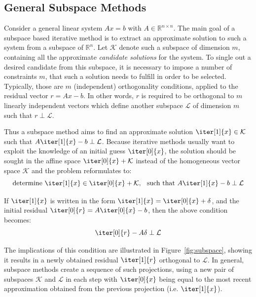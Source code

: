 \subsection{General Subspace Methods}
\label{sec:subspace_methods}

Consider a general linear system $Ax=b$ with $A \in \mathbb{R}^{n \times n}$. The main goal of a subspace based iterative method is to extract an approximate solution to such a system from a subspace of $\mathbb{R}^n$. Let $\mathcal{K}$ denote such a subspace of dimension $m$, containing all the approximate \textit{candidate solutions} for the system. To single out a desired candidate from this subspace, it is necessary to impose a number of constraints $m$, that such a solution needs to fulfill in order to be selected. Typically, those are $m$ (independent) orthogonality conditions, applied to the residual vector $r = Ax-b$. In other words, $r$ is required to be orthogonal to $m$ linearly independent vectors which define another subspace $\mathcal{L}$ of dimension $m$ such that $r \perp \mathcal{L}$.

Thus a subspace method aims to find an approximate solution $\iter[1]{x}\in \mathcal{K}$ such that $A\iter[1]{x}-b \perp \mathcal{L}$. Because iterative methods usually want to exploit the knowledge of an initial guess $\iter[0]{x}$, the solution should be sought in the affine space $\iter[0]{x}+\mathcal{K}$ instead of the homogeneous vector space $\mathcal{K}$ \cite{saad_iterative_2003} and the problem reformulates to:
\begin{equation}
    \text{determine } \iter[1]{x} \in \iter[0]{x}+\mathcal{K}\text{,}\;\;\text{  such that } A\iter[1]{x}-b \perp \mathcal{L}
\end{equation}

\noindent If $\iter[1]{x}$ is written in the form $\iter[1]{x}=\iter[0]{x}+\delta$, and the initial residual $\iter[0]{r} = A\iter[0]{x}-b$, then the above condition becomes:
\begin{equation}
    \iter[0]{r} - A\delta \perp \mathcal{L}
\end{equation}

\noindent The implications of this condition are illustrated in Figure~\hyperref[fig:subspace]{\ref{fig:subspace}}, showing it results in a  newly obtained residual $\iter[1]{r}$ orthogonal to $\mathcal{L}$. In general, subspace methods create a sequence of such projections, using a new pair of subspaces $\mathcal{K}$ and $\mathcal{L}$ in each step with $\iter[0]{x}$ being equal to the most recent approximation obtained from the previous projection (i.e. $\iter[1]{x}$).

